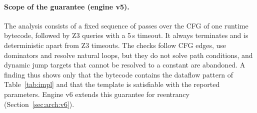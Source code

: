 \documentclass[pdflatex,sn-mathphys]{sn-jnl}
\theoremstyle{thmstyletwo}
\theoremstyle{thmstyletwo}
\begin{document}
\paragraph{Scope of the guarantee (engine v5).} The analysis consists of a fixed sequence of passes over the CFG of one runtime bytecode, followed by Z3 queries with a 5\,s timeout. It always terminates and is deterministic apart from Z3 timeouts. The checks follow CFG edges, use dominators and resolve natural loops, but they do not solve path conditions, and dynamic jump targets that cannot be resolved to a constant are abandoned. A finding thus shows only that the bytecode contains the dataflow pattern of Table~\ref{tab:impl} and that the template is satisfiable with the reported parameters. Engine v6 extends this guarantee for reentrancy (Section~\ref{sec:arch:v6}).
\end{document}

